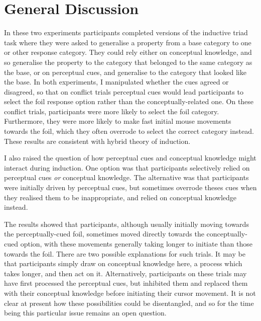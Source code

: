 

\section{General Discussion}


In these two experiments
participants completed versions of the inductive triad task
where they were asked to generalise a property from a base category
to one or other response category.
They could rely either on conceptual knowledge,
and so generalise the property to the category that
belonged to the same category as the base,
or on perceptual cues,
and generalise to the category that looked like the base.
In both experiments, I manipulated whether the cues agreed or disagreed,
so that on conflict trials perceptual cues would lead participants
to select the foil response option rather than the
conceptually-related one.
On these conflict trials, participants were
more likely to select the foil category.
Furthermore, they were more likely to make
fast initial mouse movements towards the foil,
which they often overrode to select the correct category instead.
These results are consistent with  hybrid theory of induction.

I also raised the question of how perceptual cues
and conceptual knowledge might interact during induction.
One option was that participants
selectively relied on perceptual cues \emph{or} conceptual knowledge.
The alternative was that participants were
initially driven by perceptual cues,
but sometimes overrode theses cues when they realised them to be inappropriate,
and relied on conceptual knowledge instead.

The results showed that participants,
although usually initially moving towards the perceptually-cued foil,
sometimes moved directly towards the conceptually-cued option,
with these movements generally taking longer to initiate
than those towards the foil.
There are two possible explanations for such trials.
It may be that participants simply draw on conceptual knowledge here,
a process which takes longer, and then act on it.
Alternatively, participants on these trials
may have first processed the perceptual cues,
but inhibited them and replaced them with their conceptual knowledge
before initiating their cursor movement.
It is not clear at present how these possibilities could be disentangled,
and so for the time being this particular issue remains an open question.

